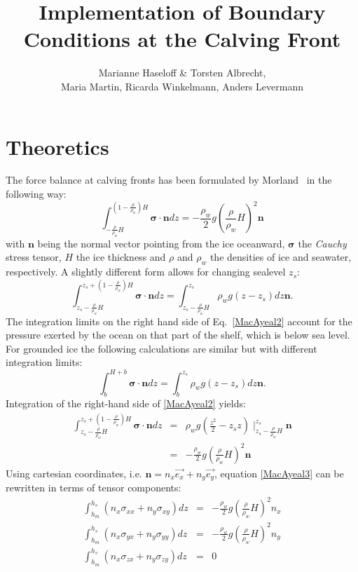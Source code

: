 \documentclass[a4paper,10pt]{article}
\title{Implementation of Boundary Conditions at the Calving Front}
\author{Marianne Haseloff \& Torsten Albrecht,\\ Maria Martin, Ricarda Winkelmann, Anders Levermann}
\begin{document}
\maketitle
\section{Theoretics}
The force balance at calving fronts has been formulated by Morland~\cite{Morland87} in the following way:
\begin{equation}%
\int_{-\frac{\rho}{\rho_w}H}^{(1-\frac{\rho}{\rho_w})H}\mathbf{\sigma}\cdot\mathbf{n}dz = -\frac{\rho_w}{2}g\left(\frac{\rho}{\rho_w}H \right)^2\mathbf{n}
\label{MacAyeal1}
\end{equation}
with $\mathbf{n}$ being the normal vector pointing from the ice
oceanward, $\mathbf{\sigma}$ the \emph{Cauchy} stress tensor, $H$ the ice thickness and $\rho$ and $\rho_{w}$ the densities of ice and seawater, respectively. A slightly different form allows for changing sealevel $z_s$:
\begin{equation}
\int_{z_s-\frac{\rho}{\rho_w}H}^{z_s+(1-\frac{\rho}{\rho_w})H}\mathbf{\sigma}\cdot\mathbf{n}dz = \int_{z_s-\frac{\rho}{\rho_w}H}^{z_s}\rho_w g (z-z_s) dz\mathbf{n}.
\label{MacAyeal2}
\end{equation}
The integration limits on the right hand side of Eq.~\eqref{MacAyeal2} account for the pressure exerted by the ocean on that part of the shelf, which is below sea level. For grounded ice the following calculations are similar but with different integration limits:
\begin{equation}
\int_{b}^{H+b}\mathbf{\sigma}\cdot\mathbf{n}dz = \int_{b}^{z_s}\rho_w g (z-z_s) dz\mathbf{n}.
\label{BC_sheet}
\end{equation} 
Integration of the right-hand side of \eqref{MacAyeal2} yields:
\begin{eqnarray}
\int_{z_s-\frac{\rho}{\rho_w}H}^{z_s+(1-\frac{\rho}{\rho_w})H}\mathbf{\sigma}\cdot\mathbf{n}dz & = & \rho_w g \left(\frac{z^2}{2}-z_s z\right)\mid_{z_s-\frac{\rho}{\rho_w}H}^{z_s}\mathbf{n} \\
& = &  -\frac{\rho_w}{2}g\left(\frac{\rho}{\rho_w}H \right)^2\mathbf{n}  \label{MacAyeal3} 
\end{eqnarray}
\noindent Using cartesian coordinates,
i.e. $\mathbf{n}=n_x\overrightarrow{e_x}+n_y\overrightarrow{e_y}$, equation
\eqref{MacAyeal3} can be rewritten in terms of tensor components:
\begin{eqnarray*}
\int_{h_m}^{h_s}(n_x\sigma_{xx}+n_y\sigma_{xy})dz & = & -\frac{\rho_w}{2}g\left(\frac{\rho}{\rho_w}H\right)^2n_x  \\
\int_{h_m}^{h_s}(n_x\sigma_{yx}+n_y\sigma_{yy})dz & = & -\frac{\rho_w}{2}g\left(\frac{\rho}{\rho_w}H\right)^2n_y  \\
\int_{h_m}^{h_s}(n_x\sigma_{zx}+n_y\sigma_{zy})dz & = & 0
\end{eqnarray*}
\end{document}
